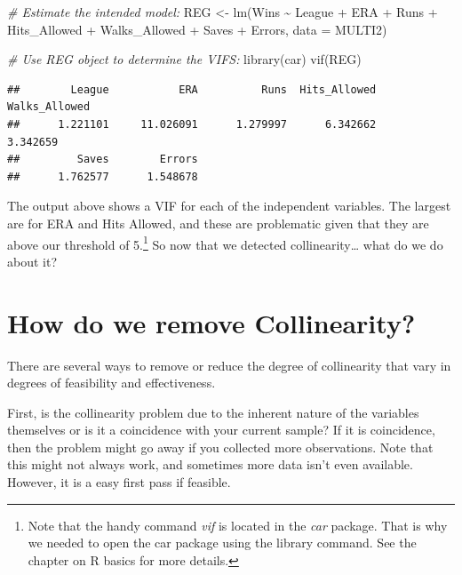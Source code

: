 \documentclass[
]{book}
\newenvironment{Shaded}{\begin{snugshade}}{\end{snugshade}}
\newcommand{\AttributeTok}[1]{\textcolor[rgb]{0.77,0.63,0.00}{#1}}
\newcommand{\CommentTok}[1]{\textcolor[rgb]{0.56,0.35,0.01}{\textit{#1}}}
\newcommand{\FunctionTok}[1]{\textcolor[rgb]{0.00,0.00,0.00}{#1}}
\newcommand{\NormalTok}[1]{#1}
\newcommand{\OtherTok}[1]{\textcolor[rgb]{0.56,0.35,0.01}{#1}}
\newcommand{\SpecialCharTok}[1]{\textcolor[rgb]{0.00,0.00,0.00}{#1}}
\begin{document}
\begin{Shaded}
\begin{Highlighting}[]
\CommentTok{\# Estimate the \textquotesingle{}intended\textquotesingle{} model:}
\NormalTok{REG }\OtherTok{\textless{}{-}} \FunctionTok{lm}\NormalTok{(Wins }\SpecialCharTok{\textasciitilde{}}\NormalTok{ League }\SpecialCharTok{+}\NormalTok{ ERA }\SpecialCharTok{+}\NormalTok{ Runs }\SpecialCharTok{+}\NormalTok{ Hits\_Allowed }\SpecialCharTok{+} 
\NormalTok{            Walks\_Allowed }\SpecialCharTok{+}\NormalTok{ Saves }\SpecialCharTok{+}\NormalTok{ Errors, }\AttributeTok{data =}\NormalTok{ MULTI2)}

\CommentTok{\# Use REG object to determine the VIFS:}
\FunctionTok{library}\NormalTok{(car)}
\FunctionTok{vif}\NormalTok{(REG)}
\end{Highlighting}
\end{Shaded}

\begin{verbatim}
##        League           ERA          Runs  Hits_Allowed Walks_Allowed 
##      1.221101     11.026091      1.279997      6.342662      3.342659 
##         Saves        Errors 
##      1.762577      1.548678
\end{verbatim}

The output above shows a VIF for each of the independent variables. The largest are for ERA and Hits Allowed, and these are problematic given that they are above our threshold of 5.\footnote{Note that the handy command \emph{vif} is located in the \emph{car} package. That is why we needed to open the car package using the library command. See the chapter on R basics for more details.} So now that we detected collinearity\ldots{} what do we do about it?

\hypertarget{how-do-we-remove-collinearity}{%
\section{How do we remove Collinearity?}\label{how-do-we-remove-collinearity}}

There are several ways to remove or reduce the degree of collinearity that vary in degrees of feasibility and effectiveness.

First, is the collinearity problem due to the inherent nature of the variables themselves or is it a coincidence with your current sample? If it is coincidence, then the problem might go away if you collected more observations. Note that this might not always work, and sometimes more data isn't even available. However, it is a easy first pass if feasible.
\end{document}
